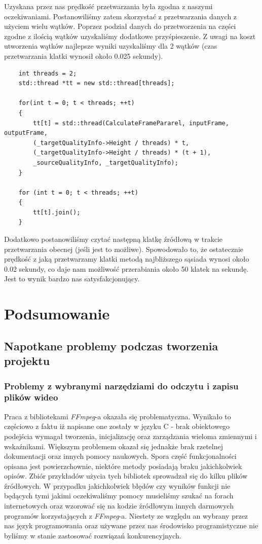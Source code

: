 \documentclass[twoside]{projektInzynierskiMS}
\begin{document}
Uzyskana przez nas prędkość przetwarzania była zgodna z naszymi oczekiwaniami. Postanowiliśmy zatem skorzystać z przetwarzania danych z użyciem wielu wątków. Poprzez podział danych do przetworzenia na części zgodne z ilością wątków uzyskaliśmy dodatkowe przyśpieszenie. Z uwagi na koszt utworzenia wątków najlepsze wyniki uzyskaliśmy dla 2 wątków (czas przetwarzania klatki wynosił około 0.025 sekundy). 

\begin{verbatim}
    int threads = 2;
    std::thread *tt = new std::thread[threads];

    for(int t = 0; t < threads; ++t)
    {
        tt[t] = std::thread(CalculateFramePararel, inputFrame, outputFrame,
        (_targetQualityInfo->Height / threads) * t, 
        (_targetQualityInfo->Height / threads) * (t + 1),
        _sourceQualityInfo, _targetQualityInfo);
    }

    for (int t = 0; t < threads; ++t)
    {
        tt[t].join();
    }
\end{verbatim}

Dodatkowo postanowiliśmy czytać następną klatkę źródłową w trakcie przetwarzania obecnej (jeśli jest to możliwe). Spowodowało to, że ostatecznie prędkość z jaką przetwarzamy klatki metodą najbliższego sąsiada wynosi około 0.02 sekundy, co daje nam możliwość przerabiania około 50 klatek na sekundę. Jest to wynik bardzo nas satysfakcjonujący.

\section{Podsumowanie}
\subsection{Napotkane problemy podczas tworzenia projektu}
\subsubsection{Problemy z wybranymi narzędziami do odczytu i zapisu plików wideo}
Praca z bibliotekami \emph{FFmpeg}-a okazała się problematyczna. Wynikało to częściowo z faktu iż napisane one zostały w języku C - brak obiektowego podejścia wymagał tworzenia, inicjalizację oraz zarządzania wieloma zmiennymi i wskaźnikami. Większym problemem okazał się jednakże brak rzetelnej dokumentacji oraz innych pomocy naukowych. Spora część funkcjonalności opisana jest powierzchownie, niektóre metody posiadają braku jakichkolwiek opisów. Zbiór przykładów użycia tych bibliotek sprowadzał się do kilku plików źródłowych. W przypadku jakichkolwiek błędów czy wyników funkcji nie będących tymi jakimi oczekiwaliśmy pomocy musieliśmy szukać na forach internetowych oraz wzorować się na kodzie źródłowym innych darmowych programów korzystających z \emph{FFmpeg}-a. Niestety ze względu an wybrany przez nas język programowania oraz używane przez nas środowisko programistyczne nie byliśmy w stanie zastosować rozwiązań konkurencyjnych.
\end{document}
